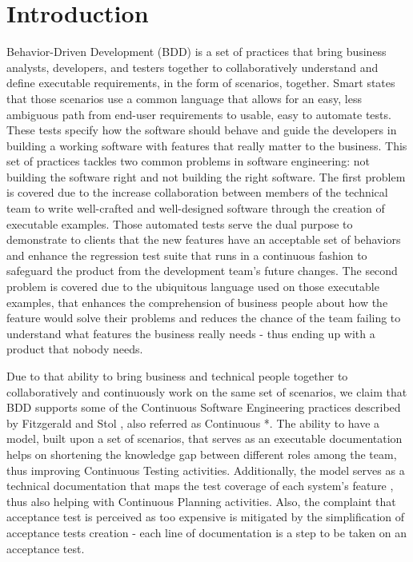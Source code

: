 \section{Introduction}

Behavior-Driven Development (BDD) is a set of practices that bring business analysts, developers, and testers together to collaboratively understand and define executable requirements, in the form of scenarios, together. Smart \cite{Smart_2014} states that those scenarios use a common language that allows for an easy, less ambiguous path from end-user requirements to usable, easy to automate tests. These tests specify how the software should behave and guide the developers in building a working software with features that really matter to the business. This set of practices tackles two common problems in software engineering: not building the software right and not building the right software. The first problem is covered due to the increase collaboration between members of the technical team to write well-crafted and well-designed software through the creation of executable examples. Those automated tests serve the dual purpose to demonstrate to clients that the new features have an acceptable set of behaviors and enhance the regression test suite that runs in a continuous fashion to safeguard the product from the development team's future changes. The second problem is covered due to the ubiquitous language used on those executable examples, that enhances the comprehension of business people about how the feature would solve their problems and reduces the chance of the team failing to understand what features the business really needs - thus ending up with a product that nobody needs.

Due to that ability to bring business and technical people together to collaboratively and continuously work on the same set of scenarios, we claim that BDD supports some of the Continuous Software Engineering  practices described by Fitzgerald and Stol \cite{Fitzgerald_Stol_2014}, also referred as Continuous *. The ability to have a model, built upon a set of scenarios, that serves as an executable documentation helps on shortening the knowledge gap between different roles among the team, thus improving Continuous Testing activities. Additionally, the model serves as a technical documentation that maps the test coverage of each system's feature \cite{Neely_Stolt_2013}, thus also helping with Continuous Planning activities. Also, the complaint that acceptance test is perceived as too expensive \cite{Humble_Farley_2010} is mitigated by the simplification of acceptance tests creation - each line of documentation is a step to be taken on an acceptance test.


